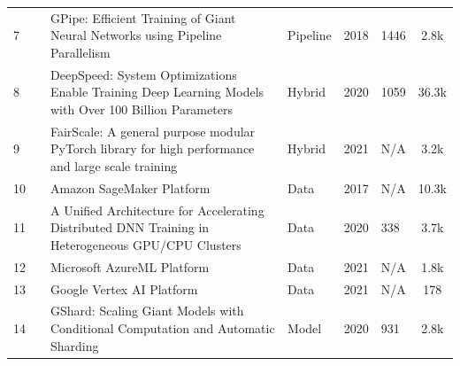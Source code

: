 \begin{table}[htbp]
\begin{tabular}{llp{8.4cm}lllc}
		\small 7           & \small \cite{huang_gpipe_2019}          & \small GPipe: Efficient Training of Giant Neural Networks using Pipeline Parallelism                             & \small Pipeline      & \small 2018          & \small 1446               & \small 2.8k \cite{noauthor_tensorflowlingvo_2025}                    \\[1ex]
		\small 8           & \small \cite{rasley_deepspeed_2020}     & \small DeepSpeed: System Optimizations Enable Training Deep Learning Models with Over 100 Billion Parameters     & \small Hybrid        & \small 2020          & \small 1059               & \small 36.3k \cite{noauthor_microsoftdeepspeed_2025}                 \\[1ex]
		\small 9           & \small \cite{noauthor_fairscale_nodate} & \small FairScale:  A general purpose modular PyTorch library for high performance and large scale training       & \small Hybrid        & \small 2021          & \small N/A                & \small 3.2k \cite{FairScale2021}                                     \\[1ex]
		\small 10          & \small \cite{noauthor_amazon_nodate}    & \small Amazon SageMaker Platform                                                                                 & \small Data          & \small 2017          & \small N/A                & \small 10.3k \cite{noauthor_awsamazon-sagemaker-examples_2025}       \\[1ex]
		\small 11          & \small \cite{jiang_unified_nodate}      & \small A Unified Architecture for Accelerating Distributed DNN Training in Heterogeneous GPU/CPU Clusters        & \small Data          & \small 2020          & \small 338                & \small 3.7k \cite{noauthor_bytedancebyteps_2025}                     \\[1ex]
		\small 12          & \small \cite{sdgilley_azure_nodate}     & \small Microsoft AzureML Platform                                                                                & \small Data          & \small 2021          & \small N/A                & \small 1.8k \cite{noauthor_azureazureml-examples_2025}               \\[1ex]
		\small 13          & \small \cite{noauthor_vertex_nodate}    & \small Google Vertex AI Platform                                                                                 & \small Data          & \small 2021          & \small N/A                & \small 178 \cite{noauthor_googlecloudplatformvertex-ai-samples_2025} \\[1ex]
		\small 14          & \small \cite{lepikhin_gshard_2020}      & \small GShard: Scaling Giant Models with Conditional Computation and Automatic Sharding                          & \small Model         & \small 2020          & \small 931                & \small 2.8k \cite{noauthor_tensorflowlingvo_2025}                    \\[1ex]

\end{tabular}
\end{table}
